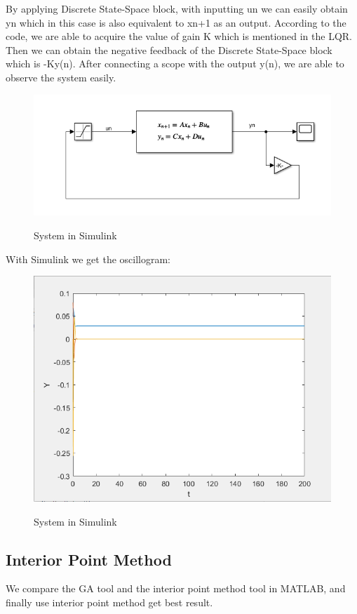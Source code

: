 \documentclass{mcmthesis}
\begin{document}
By applying Discrete State-Space block, with inputting un we can easily obtain yn which in this case is also equivalent to xn+1 as an output. According to the code, we are able to acquire the value of gain K which is mentioned in the LQR. Then we can obtain the negative feedback of the Discrete State-Space block which is -Ky(n). After connecting a scope with the output y(n), we are able to observe the system easily.
\begin{figure}[H]%
  \centering
  \caption{System in Simulink}
  \includegraphics[width=50ex]{Optimal Control of a Linear Discrete System/MCM20200128/picture/框图.png} %
  \label{Fig.RNN} %
\end{figure}
With Simulink we get the oscillogram:
\begin{figure}[H]%
  \centering
  \caption{System in Simulink}
  \includegraphics[width=50ex]{Optimal Control of a Linear Discrete System/MCM20200128/picture/波形.png} %
  \label{Fig.RNN} %
\end{figure}

\subsection{Interior Point Method}
We compare the GA\cite{GenTut} tool and the interior point method\cite{conf/aaai/MladenovBK17}  tool in MATLAB, and finally use interior point method get best result.\cite{journals/siamjo/HelmbergRVW96}\cite{journals/software/AstfalkLMS92}\cite{journals/mp/WangMP96}  
\end{document}
